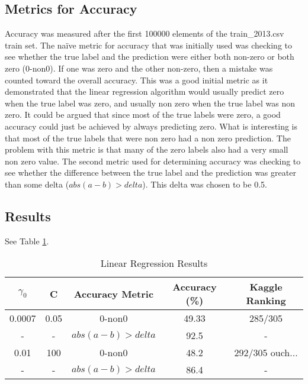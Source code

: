﻿\documentclass[pdftex,a4paper,12pt]{article}
\begin{document}
\subsection{Metrics for Accuracy}
Accuracy was measured after the first 100000 elements of the train\_2013.csv train set. The na{\"i}ve metric for accuracy that was initially used was checking to see whether the true label and the prediction were either both non-zero or both zero (0-non0). If one was zero and the other non-zero, then a mistake was counted toward the overall accuracy. This was a good initial metric as it demonstrated that the linear regression algorithm would usually predict zero when the true label was zero, and usually non zero when the true label was non zero. It could be argued that since most of the true labels were zero, a good accuracy could just be achieved by always predicting zero. What is interesting is that most of the true labels that were non zero had a non zero prediction. The problem with this metric is that many of the zero labels also had a very small non zero value. The second metric used for determining accuracy was checking to see whether the difference between the true label and the prediction was greater than some delta ($abs(a - b) > delta$). This delta was chosen to be 0.5.
\subsection{Results}
See Table \ref{table:linAcc}.
  \begin{table}[h]
        {\centering
          \begin{tabular}{|c|c|c|c|c|}
            \hline
             $\gamma_0$ & C & Accuracy Metric & Accuracy (\%) & Kaggle Ranking\\
            \hline
                0.0007 &   0.05        & 0-non0 & 49.33 & 285/305 \\
             \hline
                - &   -        & $abs(a - b) > delta$ & 92.5 & - \\
                  \hline
                0.01 &  100         &  0-non0  & 48.2 & 292/305   ouch... \\
          \hline
                - &  -         & $abs(a - b) > delta$ & 86.4 & - \\
             \hline
          \end{tabular}
          \caption{Linear Regression Results}          
          \label{table:linAcc}}
  \end{table}
\end{document}
